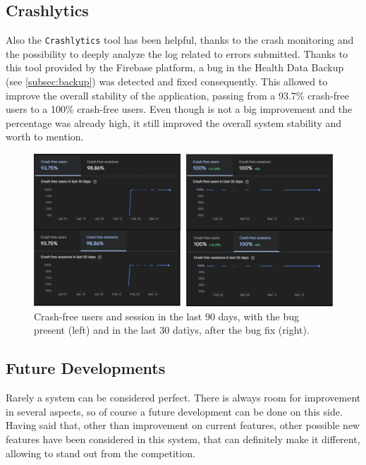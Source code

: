 \subsection{Crashlytics}
Also the \texttt{Crashlytics} tool has been helpful, thanks to the crash monitoring and the possibility to deeply analyze the log related to errors submitted. Thanks to this tool provided by the Firebase platform, a bug in the Health Data Backup (see \cref{subsec:backup}) was detected and fixed consequently. This allowed to improve the overall stability of the application, passing from a 93.7\% crash-free users to a 100\% crash-free users. Even though is not a big improvement and the percentage was already high, it still improved the overall system stability and worth to mention.
\vspace{10ex}
\begin{figure}
    \includegraphics[width=1.0\linewidth]{./images/crashlytics.jpg}
    \caption{Crash-free users and session in the last 90 days, with the bug present (left) and in the last 30 datìys, after the bug fix (right).}
\end{figure}

\newpage
\subsection{Future Developments}
Rarely a system can be considered perfect. There is always room for improvement in several aspects, so of course a future development can be done on this side.
\newline Having said that, other than improvement on current features, other possible new features have been considered in this system, that can definitely make it different, allowing to stand out from the competition. 

